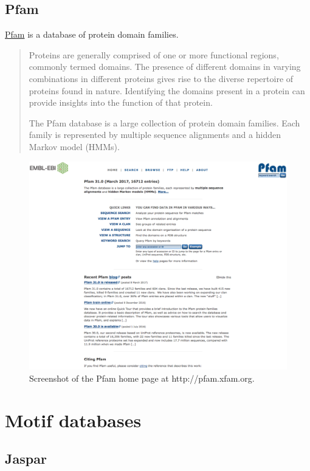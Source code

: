 \documentclass[]{book}
\theoremstyle{definition}
\theoremstyle{definition}
\theoremstyle{definition}
\theoremstyle{remark}
\begin{document}
\subsection{Pfam}\label{pfam}

\href{http://pfam.xfam.org}{Pfam} is a database of protein domain
families.

\begin{quote}
Proteins are generally comprised of one or more functional regions,
commonly termed domains. The presence of different domains in varying
combinations in different proteins gives rise to the diverse repertoire
of proteins found in nature. Identifying the domains present in a
protein can provide insights into the function of that protein.

The Pfam database is a large collection of protein domain families. Each
family is represented by multiple sequence alignments and a hidden
Markov model (HMMs).
\end{quote}

\begin{figure}
\includegraphics[width=16.97in]{pic/pfam_web} \caption{Screenshot of the Pfam home page at http://pfam.xfam.org.}\label{fig:pfam-web}
\end{figure}

\section{Motif databases}\label{motif-databases}

\subsection{Jaspar}\label{jaspar}
\end{document}
